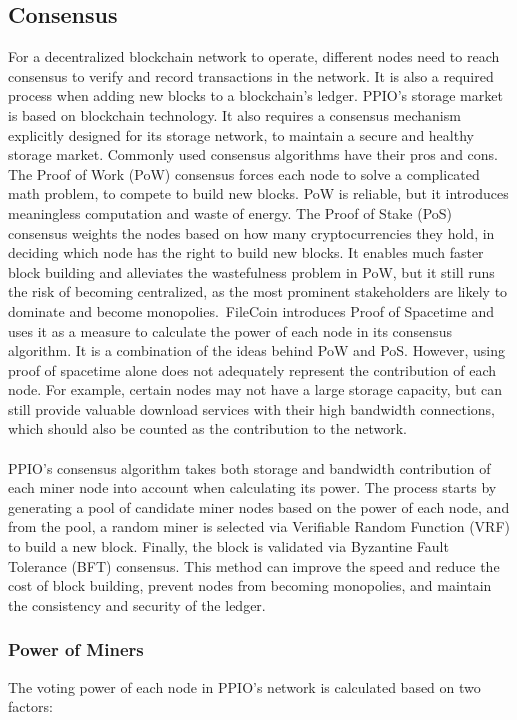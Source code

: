 \documentclass[10pt,a4paper]{article}
\begin{document}
                \subsection{Consensus}%
For a decentralized blockchain network to operate, different nodes need to reach consensus to verify and record transactions in the network. It is also a required process when adding new blocks to a blockchain’s ledger. PPIO’s storage market is based on blockchain technology. It also requires a consensus mechanism explicitly designed for its storage network, to maintain a secure and healthy storage market. Commonly used consensus algorithms have their pros and cons. The Proof of Work (PoW) consensus forces each node to solve a complicated math problem, to compete to build new blocks. PoW is reliable, but it introduces meaningless computation and waste of energy. The Proof of Stake (PoS) consensus weights the nodes based on how many cryptocurrencies they hold, in deciding which node has the right to build new blocks. It enables much faster block building and alleviates the wastefulness problem in PoW, but it still runs the risk of becoming centralized, as the most prominent stakeholders are likely to dominate and become monopolies. FileCoin introduces Proof of Spacetime and uses it as a measure to calculate the power of each node in its consensus algorithm. It is a combination of the ideas behind PoW and PoS. However, using proof of spacetime alone does not adequately represent the contribution of each node. For example, certain nodes may not have a large storage capacity, but can still provide valuable download services with their high bandwidth connections, which should also be counted as the contribution to the network.
\vspace{-0.5em}
 \\ \\PPIO’s consensus algorithm takes both storage and bandwidth contribution of each miner node into account when calculating its power. The process starts by generating a pool of candidate miner nodes based on the power of each node, and from the pool, a random miner is selected via Verifiable Random Function (VRF) to build a new block. Finally, the block is validated via Byzantine Fault Tolerance (BFT) consensus. This method can improve the speed and reduce the cost of block building, prevent nodes from becoming monopolies, and maintain the consistency and security of the ledger.
\vspace{-0.5em}

                       \subsubsection{Power of Miners}  %
The voting power of each node in PPIO’s network is calculated based on two factors:
\vspace{-0.8em}
\\
\end{document}
